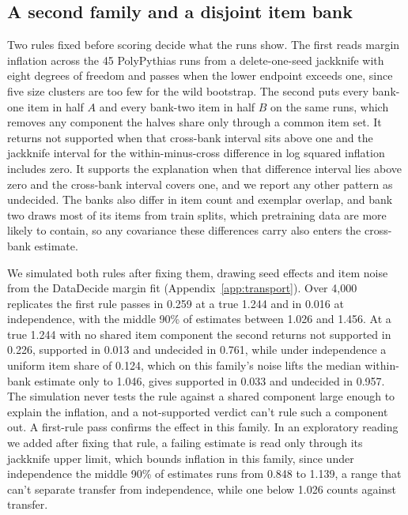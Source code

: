 \subsection{A second family and a disjoint item bank}
\label{sec:family}
Two rules fixed before scoring decide what the runs show. The first reads margin inflation across the 45 PolyPythias runs from a delete-one-seed jackknife with eight degrees of freedom and passes when the lower endpoint exceeds one, since five size clusters are too few for the wild bootstrap. The second puts every bank-one item in half $A$ and every bank-two item in half $B$ on the same runs, which removes any component the halves share only through a common item set. It returns not supported when that cross-bank interval sits above one and the jackknife interval for the within-minus-cross difference in log squared inflation includes zero. It supports the explanation when that difference interval lies above zero and the cross-bank interval covers one, and we report any other pattern as undecided. The banks also differ in item count and exemplar overlap, and bank two draws most of its items from train splits, which pretraining data are more likely to contain, so any covariance these differences carry also enters the cross-bank estimate.

We simulated both rules after fixing them, drawing seed effects and item noise from the DataDecide margin fit (Appendix~\ref{app:transport}). Over 4,000 replicates the first rule passes in 0.259 at a true 1.244 and in 0.016 at independence, with the middle 90\% of estimates between 1.026 and 1.456. At a true 1.244 with no shared item component the second returns not supported in 0.226, supported in 0.013 and undecided in 0.761, while under independence a uniform item share of 0.124, which on this family's noise lifts the median within-bank estimate only to 1.046, gives supported in 0.033 and undecided in 0.957. The simulation never tests the rule against a shared component large enough to explain the inflation, and a not-supported verdict can't rule such a component out. A first-rule pass confirms the effect in this family. In an exploratory reading we added after fixing that rule, a failing estimate is read only through its jackknife upper limit, which bounds inflation in this family, since under independence the middle 90\% of estimates runs from 0.848 to 1.139, a range that can't separate transfer from independence, while one below 1.026 counts against transfer.


